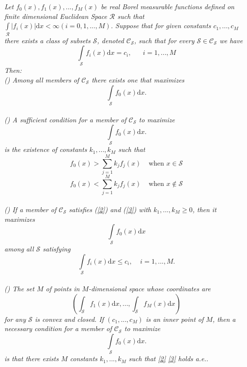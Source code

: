 \textit{
  Let $f_0(x), f_1(x), ..., f_{M}(x)$ be real Borel measurable functions  defined on finite dimensional Euclidean Space $\mathcal{R}$ such that $\int \limits_\mathcal{R} | f_i(x)|\mathrm{d}x < \infty (i=0, 1,...,M)$.  Suppose that for given constants $c_1,...,c_M$ there exists a class of subsets $\mathcal{S}$, denoted $\mathcal{C}_\mathcal{S}$, such that for every $\mathcal{S} \in \mathcal{C}_\mathcal{S}$ we have
\begin{equation}
\label{one}
\int\limits_\mathcal{S} f_i(x)\mathrm{d}x = c_i, \;\;\;\;\;\;i=1,...,M
\end{equation}
Then:
\\\textnormal{()} Among all members of $\mathcal{C}_\mathcal{S}$ there exists one that maximizes
\[
\int \limits_\mathcal{S} f_{0}(x)\mathrm{d}x.
\]
\\\textnormal{()} A sufficient condition for a member of $\mathcal{C}_\mathcal{S}$ to maximize
\[
\int \limits_\mathcal{S} f_{0}(x)\mathrm{d}x.
\]
is the existence of constants $k_1,...,k_M$ such that
\begin{equation}
\label{2}
f_{0}(x)>\sum\limits_{j=1}^M k_j f_j(x)\;\;\;\;\text{when $x \in \mathcal{S}$}
\end{equation}
\begin{equation}
\label{3}
f_{0}(x)<\sum\limits_{j=1}^M k_j f_j(x)\;\;\;\;\text{when $x \notin \mathcal{S}$}
\end{equation}
\\\textnormal{()} If a member of $\mathcal{C}_\mathcal{S}$ satisfies  \textnormal{(\ref{2})} and \textnormal{(\ref{3})} with $k_1,...,k_M\geq0$, then it maximizes
\begin{equation}
\label{4}
\int \limits_\mathcal{S} f_{0}(x)\mathrm{d}x
\end{equation}
among all $\mathcal{S}$ satisfying
\begin{equation}
\label{5}
\int \limits_\mathcal{S} f_i(x)\mathrm{d}x\leq c_i,\;\;\;\;i=1,...,M.
\end{equation}
\\\textnormal{()} The set $M$ of points in $M$-dimensional space whose coordinates are 
\begin{equation}
(\int_{\mathcal{S}}f_1(x)\mathrm{d}x, ..., \int_{\mathcal{S}}f_M(x)\mathrm{d}x)
\end{equation}
for any $\mathcal{S}$ is convex and closed. If $(c_1, ..., c_M)$ is an inner point of $M$, then a  necessary condition for a member of $\mathcal{C}_\mathcal{S}$ to maximize 
\[
\int \limits_\mathcal{S} f_{0}(x)\mathrm{d}x.
\]
is that there exists $M$ constants $k_1, ..., k_M$ such that \eqref{2} \eqref{3} holds a.e..
}

